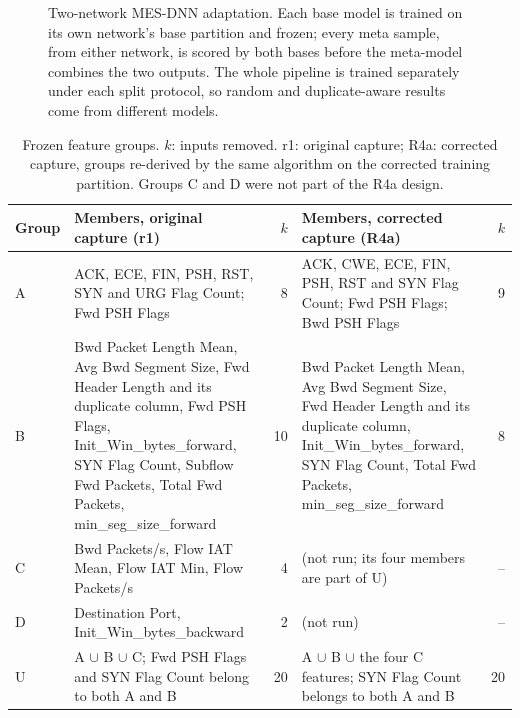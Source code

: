\documentclass[journal]{IEEEtran}
\begin{document}
\begin{figure}[!t]
\centering
\resizebox{0.95\columnwidth}{!}{}
\caption{Two-network MES-DNN adaptation. Each base model is trained on its own network's base
partition and frozen; every meta sample, from either network, is scored by both bases before the
meta-model combines the two outputs. The whole pipeline is trained separately under each split
protocol, so random and duplicate-aware results come from different models.}
\label{fig:mes}
\end{figure}

\begin{table}[!t]
\centering
\caption{\upshape Frozen feature groups. $k$: inputs removed. r1: original capture; R4a: corrected capture,
groups re-derived by the same algorithm on the corrected training partition. Groups C and D were
not part of the R4a design.}
\label{tab:groups}
\small
\renewcommand{\arraystretch}{1.15}
\begin{tabular}{@{}lL{7.4cm}rL{6.6cm}r@{}}
\toprule
Group & Members, original capture (r1) & $k$ & Members, corrected capture (R4a) & $k$ \\
\midrule
A & ACK, ECE, FIN, PSH, RST, SYN and URG Flag Count; Fwd PSH Flags & 8 & ACK, CWE, ECE, FIN, PSH, RST and SYN Flag Count; Fwd PSH Flags; Bwd PSH Flags & 9 \\
B & Bwd Packet Length Mean, Avg Bwd Segment Size, Fwd Header Length and its duplicate column, Fwd PSH Flags, Init\_Win\_bytes\_forward, SYN Flag Count, Subflow Fwd Packets, Total Fwd Packets, min\_seg\_size\_forward & 10 & Bwd Packet Length Mean, Avg Bwd Segment Size, Fwd Header Length and its duplicate column, Init\_Win\_bytes\_forward, SYN Flag Count, Total Fwd Packets, min\_seg\_size\_forward & 8 \\
C & Bwd Packets/s, Flow IAT Mean, Flow IAT Min, Flow Packets/s & 4 & (not run; its four members are part of U) & -- \\
D & Destination Port, Init\_Win\_bytes\_backward & 2 & (not run) & -- \\
U & A $\cup$ B $\cup$ C; Fwd PSH Flags and SYN Flag Count belong to both A and B & 20 & A $\cup$ B $\cup$ the four C features; SYN Flag Count belongs to both A and B & 20 \\
\bottomrule
\end{tabular}
\end{table}
\end{document}
